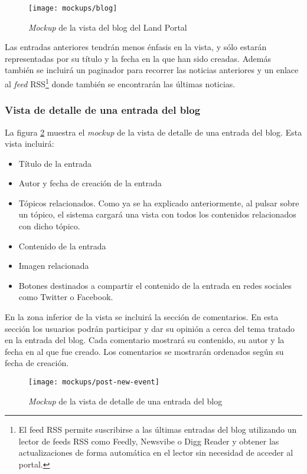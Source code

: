 \begin{figure}[h]
	\centering
	\texttt{[image: mockups/blog]}
	\caption{\textit{Mockup} de la vista del blog del Land Portal}
	\label{fig:mockup_blog}
\end{figure}

Las entradas anteriores tendrán menos énfasis en la vista, y sólo estarán representadas por su título y la fecha en la que han sido creadas.  Además también se incluirá un paginador para recorrer las noticias anteriores y un enlace al \textit{feed} RSS\footnote{El feed RSS permite suscribirse a las últimas entradas del blog utilizando un lector de feeds RSS como Feedly, Newsvibe o Digg Reader y obtener las actualizaciones de forma automática en el lector sin necesidad de acceder al portal.} donde también se encontrarán las últimas noticias.


\subsubsection{Vista de detalle de una entrada del blog}
\label{chapter04:mockup_blog_entry}
La figura \ref{fig:mockup_entrada_blog} muestra el \textit{mockup} de la vista de detalle de una entrada del blog.  Esta vista incluirá:
\begin{itemize}
	\item Título de la entrada
	\item Autor y fecha de creación de la entrada
	\item Tópicos relacionados.  Como ya se ha explicado anteriormente, al pulsar sobre un tópico, el sistema cargará una vista con todos los contenidos relacionados con dicho tópico.
	\item Contenido de la entrada
	\item Imagen relacionada
	\item Botones destinados a compartir el contenido de la entrada en redes sociales como Twitter o Facebook.
\end{itemize}

En la zona inferior de la vista se incluirá la sección de comentarios.  En esta sección los usuarios podrán participar y dar su opinión a cerca del tema tratado en la entrada del blog.  Cada comentario mostrará su contenido, su autor y la fecha en al que fue creado.  Los comentarios se mostrarán ordenados según su fecha de creación.

\begin{figure}[h]
	\centering
	\texttt{[image: mockups/post-new-event]}
	\caption{\textit{Mockup} de la vista de detalle de una entrada del blog}
	\label{fig:mockup_entrada_blog}
\end{figure}


